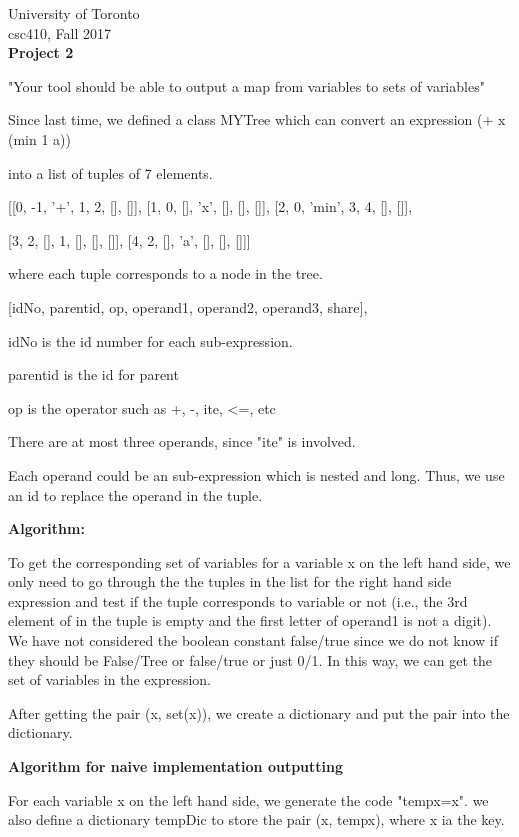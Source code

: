 \documentclass{article}
\begin{document}
\noindent
University of Toronto\\
{\sc csc}410, Fall 2017\\[10pt]
{\LARGE\bf Project 2}

"Your tool should be able to output a map from variables to sets of variables"

Since last time, we defined a class MYTree which can convert an expression (+ x (min 1 a))

into a list of tuples of 7 elements. 

 [[0, -1, '+', 1, 2, [], []], [1, 0, [], 'x', [], [], []], [2, 0, 'min', 3, 4, [], []],
  
  [3, 2, [], 1, [], [], []], [4, 2, [], 'a', [], [], []]]

where each tuple corresponds to a node in the tree.

 [idNo, parentid, op, operand1, operand2, operand3, share],
 
         idNo is the id number for each sub-expression.
         
         parentid is the id for parent
         
         op is the operator such as +, -, ite, <=, etc
         
         There are at most three operands, since "ite" is involved.
         
         Each operand could be an sub-expression which is nested and long. Thus, we use an id to replace the operand in the tuple.



\noindent
{\bf Algorithm:}

To get the corresponding set of variables for a variable x on the left hand side, we only need to go through the the tuples in the list
for the right hand side expression and test if the tuple corresponds to variable or not  (i.e., the 3rd element of in the tuple is empty
and the first letter of operand1 is not a digit). We have not considered the boolean constant false/true since we do not know if they should be False/Tree or false/true or just 0/1. In this way, we can get the set of variables in the expression.

After getting the pair (x, set(x)), we create a dictionary and put the pair into the dictionary. 

{\bf Algorithm for naive implementation outputting}

For each variable x on the left hand side, we generate the code "tempx=x". we also define a dictionary tempDic to store 
the pair (x, tempx), where x ia the key. 
\end{document}
